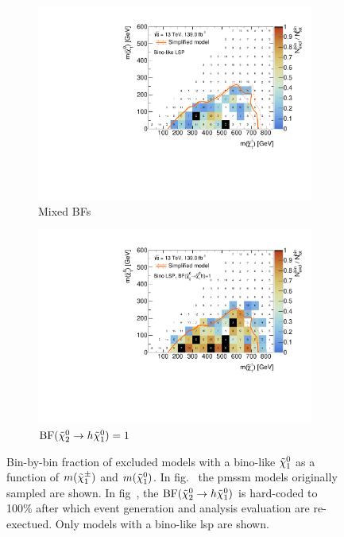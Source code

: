 \begin{figure}
	\centering
	\begin{subfigure}[b]{0.49\linewidth}
		\centering\includegraphics[width=\textwidth]{cut_bino_LSP/mchi1p_mlsp_contour}
		\caption{Mixed BFs\label{fig:mchi1p_mchi20_contour_bino_lsp_orig}}
	\end{subfigure}\hfill
	\begin{subfigure}[b]{0.49\linewidth}
		\centering\includegraphics[width=\textwidth]{cut_none_bino_LSP_Wh-only/mchi1p_mlsp_contour}
		\caption{$\mathrm{BF}(\tilde{\chi}_2^0 \rightarrow h \tilde{\chi}_1^0) = 1$\label{fig:mchi1p_mchi20_contour_bino_lsp_wh_only}}
	\end{subfigure}\hfill
	\caption{Bin-by-bin fraction of excluded models with a bino-like $\tilde{\chi}_1^0$ as a function of $m(\tilde{\chi}_1^\pm)$ and $m(\tilde{\chi}_1^0)$. In fig.~ the \gls{pmssm} models originally sampled are shown. In fig~, the $\mathrm{BF}(\tilde{\chi}_2^0 \rightarrow h \tilde{\chi}_1^0)$ is hard-coded to 100\% after which event generation  and \onelepton analysis evaluation are re-exectued. Only models with a bino-like \gls{lsp} are shown.}
	\label{fig:mixed_BFs}
\end{figure}

